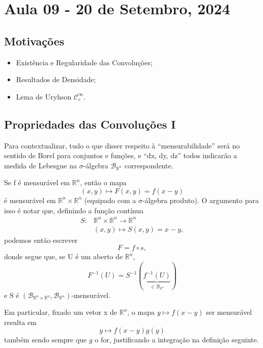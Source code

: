 \documentclass[../distribution_theory_notes.tex]{subfiles}
\begin{document}
\section{Aula 09 - 20 de Setembro, 2024}
\subsection{Motivações}
\begin{itemize}
 \item Existência e Regularidade das Convoluções;
 \item Resultados de Densidade; 
 \item Lema de Uryhson \(\mathcal{C}_{c}^{\infty}\).
\end{itemize}
\subsection{Propriedades das Convoluções I}
  Para contextualizar, tudo o que disser respeito à ``mensurabilidade'' será no sentido de Borel para conjuntos e funções, e ``dx, dy, dz'' todos indicarão a medida de Lebesgue na \(\sigma \)-álgebra \(\mathcal{B}_{\mathbb{R}^{n}}\) correspondente.
   \begin{tcolorbox}[
   skin=enhanced,
   title=Observação,
   fonttitle=\bfseries,
 colframe=black,
   colbacktitle=cyan!75!white, 
   colback=cyan!15,
   colbacklower=black,
 coltitle=black,
   drop fuzzy shadow,
   ]
   Se f é mensurável em \(\mathbb{R}^{n}\), então o mapa 
     \[
       (x, y)\mapsto F(x, y)=f(x-y)
     \]
     é mensurável em \(\mathbb{R}^{n}\times \mathbb{R}^{n}\) (equipado com a \(\sigma \)-álgebra produto). O argumento para isso é notar que, definindo a função contínua 
    \begin{align*}
      S:&\mathbb{R}^{n}\times \mathbb{R}^{n}\rightarrow \mathbb{R}^{n}\\ 
        &(x, y)\mapsto S(x, y)=x-y,
    \end{align*}
    podemos então escrever 
      \[
        F = f\circ s,
      \]
      donde segue que, se U é um aberto de \(\mathbb{R}^{n}\),
        \[
          F^{-1}(U)=S^{-1}(\underbrace{f^{-1}(U)}_{\in \mathcal{B}_{\mathbb{R}^{n}}}) 
        \]
        e S é \((\mathcal{B}_{\mathbb{R}^{n}\times \mathbb{R}^{n}}, \mathcal{B}_{\mathbb{R}^{n}})\)-mensurável.

        Em particular, fixado um vetor x de \(\mathbb{R}^{n}\), o mapa \(y\mapsto f(x-y)\) ser mensurável resulta em 
          \[
            y\mapsto f(x-y)g(y)
          \]
          também sendo sempre que \(g\) o for, justificando a integração na definição seguinte.
   \end{tcolorbox}
\end{document}
